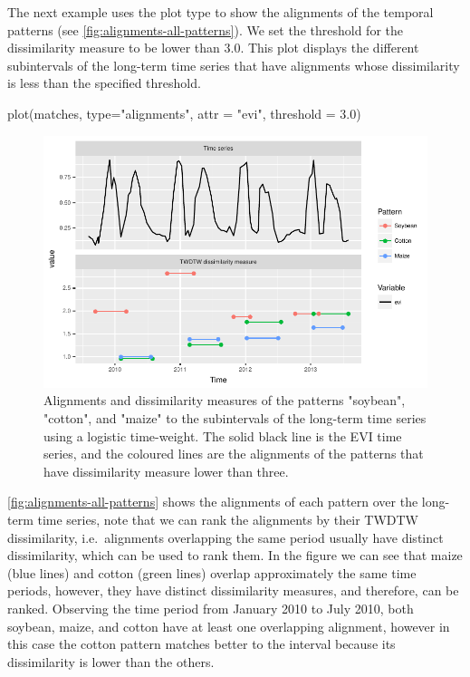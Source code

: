 \documentclass[article,shortnames]{jss}
\begin{document}
The next example uses the plot type  to show the
alignments of the temporal patterns (see
\autoref{fig:alignments-all-patterns}). We set the threshold for the
dissimilarity measure to be lower than \(3.0\). This plot displays the
different subintervals of the long-term time series that have alignments
whose dissimilarity is less than the specified threshold.

\begin{CodeChunk}
\begin{CodeInput}
plot(matches, type="alignments", attr = "evi", threshold = 3.0)
\end{CodeInput}
\begin{figure}[!h]

{\centering \includegraphics{applying_twdtw_files/figure-latex/alignments-all-patterns-1} 

}

\caption[Alignments and dissimilarity measures of the patterns "soybean", "cotton", and "maize" to the subintervals of the long-term time series using a logistic time-weight]{Alignments and dissimilarity measures of the patterns "soybean", "cotton", and "maize" to the subintervals of the long-term time series using a logistic time-weight. The solid black line is the EVI time series, and the coloured lines are the alignments of the patterns that have dissimilarity measure lower than three.}\label{fig:alignments-all-patterns}
\end{figure}
\end{CodeChunk}

\autoref{fig:alignments-all-patterns} shows the alignments of each
pattern over the long-term time series, note that we can rank the
alignments by their TWDTW dissimilarity, i.e.~alignments overlapping the
same period usually have distinct dissimilarity, which can be used to
rank them. In the figure we can see that maize (blue lines) and cotton
(green lines) overlap approximately the same time periods, however, they
have distinct dissimilarity measures, and therefore, can be ranked.
Observing the time period from January 2010 to July 2010, both soybean,
maize, and cotton have at least one overlapping alignment, however in
this case the cotton pattern matches better to the interval because its
dissimilarity is lower than the others.
\end{document}
